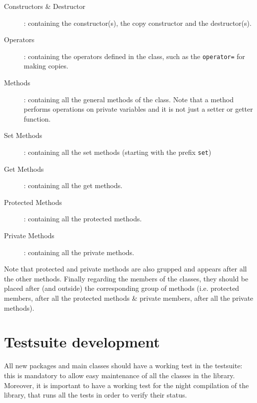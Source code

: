 \documentclass[10p]{article}
\begin{document}
\begin{enumerate}
\begin{description}
      \item[Constructors \& Destructor]: containing the constructor(s), the copy constructor and the destructor(s).
      \item[Operators]: containing the operators defined in the class, such as the \texttt{operator=} for making copies.
      \item[Methods]: containing all the general methods of the class. Note that a method performs operations on private variables and it is not just a setter or getter function.
      \item[Set Methods]: containing all the set methods (starting with the prefix \texttt{set})
      \item[Get Methods]: containing all the get methods.
      \item[Protected Methods]: containing all the protected methods.
      \item[Private Methods]: containing all the private methods.
  \end{description}
  Note that protected and private methods are also grupped and appears after all the other methods. Finally regarding the members of the classes, they should be placed after (and outside) the corresponding group of methods (i.e. protected members, after all the protected methods \& private members, after all the private methods).
\end{enumerate}

\section{Testsuite development} \label{testsuite}
All new packages and main classes should have a working test in the testsuite: this is mandatory to allow easy maintenance of all the classes in the library. Moreover, it is important to have a working test for the night compilation of the library, that runs all the tests in order to verify their status.
\end{document}
